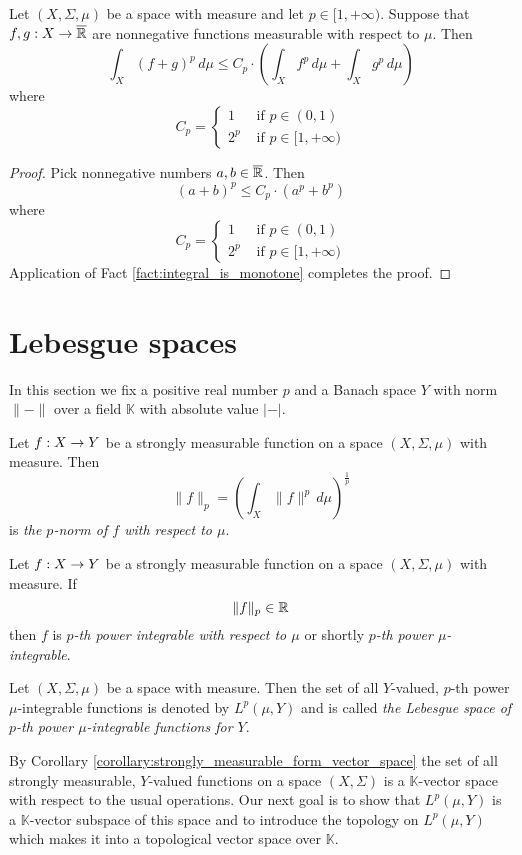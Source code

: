 \begin{proposition}\label{proposition:p_power_of_norm_inequality}
    Let $(X,\Sigma,\mu)$ be a space with measure and let $p \in [1,+\infty)$. Suppose that $f,g:X\rightarrow \overline{{\mathbb R}}$ are nonnegative functions measurable with respect to $\mu$. Then
    $$\int_X\left(f + g\right)^p\,d\mu \leq C_p\cdot
        \left(\int_X f^p\,d\mu + \int_X g^p\,d\mu\right)$$
    where
    $$C_p = \begin{cases}
            1   & \mbox{ if }p\in (0,1)       \\
            2^p & \mbox{ if }p\in [1,+\infty)
        \end{cases}$$
\end{proposition}
\begin{proof}
    Pick nonnegative numbers $a,b\in \overline{{\mathbb R}}$. Then
    $$\left(a + b\right)^p \leq C_p\cdot \left(a^p + b^p\right)$$
    where
    $$C_p = \begin{cases}
            1   & \mbox{ if }p\in (0,1)       \\
            2^p & \mbox{ if }p\in [1,+\infty)
        \end{cases}$$
    Application of Fact \ref{fact:integral_is_monotone} completes the proof.
\end{proof}

\section{Lebesgue spaces}\label{section:lebesgue_spaces}
\noindent
In this section we fix a positive real number $p$ and a Banach space $Y$ with norm $\lVert-\rVert$ over a field $\mathbb{K}$ with absolute value $|-|$.

\begin{definition}
    Let $f:X\rightarrow Y$ be a strongly measurable function on a space $(X,\Sigma,\mu)$ with measure. Then
    $$\lVert f\rVert_p = \left(\int_X\lVert f\rVert^p\,d\mu\right)^{\frac{1}{p}}$$
    is \textit{the $p$-norm of $f$ with respect to $\mu$}.
\end{definition}

\begin{definition}
    Let $f:X\rightarrow Y$ be a strongly measurable function on a space $(X,\Sigma,\mu)$ with measure. If
    $$\lVert f\rVert_p \in {\mathbb R}$$
    then $f$ is \textit{$p$-th power integrable with respect to $\mu$} or shortly \textit{$p$-th power $\mu$-integrable}.
\end{definition}

\begin{definition}
    Let $(X,\Sigma,\mu)$ be a space with measure. Then the set of all $Y$-valued, $p$-th power $\mu$-integrable functions is denoted by $L^p(\mu,Y)$ and is called \textit{the Lebesgue space of $p$-th power $\mu$-integrable functions for $Y$}.
\end{definition}
\noindent
By Corollary \ref{corollary:strongly_measurable_form_vector_space} the set of all strongly measurable, $Y$-valued functions on a space $(X,\Sigma)$ is a $\mathbb{K}$-vector space with respect to the usual operations. Our next goal is to show that $L^p(\mu,Y)$ is a $\mathbb{K}$-vector subspace of this space and to introduce the topology on $L^p(\mu,Y)$ which makes it into a topological vector space over $\mathbb{K}$.

